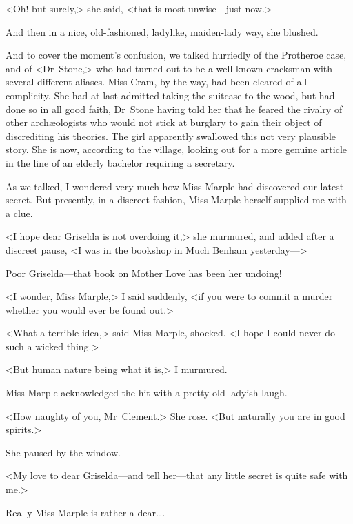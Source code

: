 <Oh! but surely,> she said, <that is most unwise—just now.>

And then in a nice, old-fashioned, ladylike, maiden-lady way, she blushed.

And to cover the moment's confusion, we talked hurriedly of the Protheroe case, and of <Dr~Stone,> who had turned out to be a well-known cracksman with several different aliases. Miss Cram, by the way, had been cleared of all complicity. She had at last admitted taking the suitcase to the wood, but had done so in all good faith, Dr~Stone having told her that he feared the rivalry of other archæologists who would not stick at burglary to gain their object of discrediting his theories. The girl apparently swallowed this not very plausible story. She is now, according to the village, looking out for a more genuine article in the line of an elderly bachelor requiring a secretary.

As we talked, I wondered very much how Miss Marple had discovered our latest secret. But presently, in a discreet fashion, Miss Marple herself supplied me with a clue.

<I hope dear Griselda is not overdoing it,> she murmured, and added after a discreet pause, <I was in the bookshop in Much Benham yesterday—>

Poor Griselda—that book on Mother Love has been her undoing!

<I wonder, Miss Marple,> I said suddenly, <if you were to commit a murder whether you would ever be found out.>

<What a terrible idea,> said Miss Marple, shocked. <I hope I could never do such a wicked thing.>

<But human nature being what it is,> I murmured.

Miss Marple acknowledged the hit with a pretty old-ladyish laugh.

<How naughty of you, Mr~Clement.> She rose. <But naturally you are in good spirits.>

She paused by the window.

\begin{a4}
	\enlargethispage{-\baselineskip}
\end{a4}

<My love to dear Griselda—and tell her—that any little secret is quite safe with me.>

Really Miss Marple is rather a dear\dots.